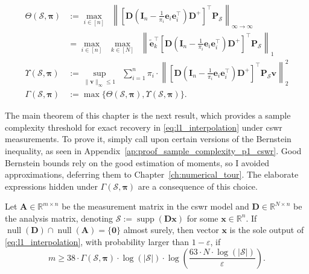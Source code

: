 \begin{definition}
    \begin{align}
        \Theta (\mathcal{S}, \bm{\pi}) & := \underset{i \in [n]}{\max} \enspace \left \| \left [ \mathbf{D} \left ( \mathbf{I}_n - \frac{1}{\pi_{i}}\mathbf{e}_{i} \mathbf{e}_{i}^\top \right ) \mathbf{D}^{+} \right ]^\top \mathbf{P}_{\mathcal{S}}\right \|_{\infty \to \infty} \\
        & = \underset{i \in [n]}{\max} \enspace \underset{k \in [N]}{\max} \enspace \left \| \tilde{\mathbf{e}}_k^{\top} \left [ \mathbf{D} \left ( \mathbf{I}_n - \frac{1}{\pi_{i}}\mathbf{e}_{i} \mathbf{e}_{i}^\top \right ) \mathbf{D}^{+} \right ]^\top \mathbf{P}_{\mathcal{S}}\right \|_{1} \\
        \Upsilon (\mathcal{S}, \bm{\pi}) & := \underset{\|\mathbf{v}\|_\infty \leq 1}{\sup} \enspace \sum_{i=1}^{n} \pi_i \cdot \left \| \left [ \mathbf{D} \left ( \mathbf{I}_n - \frac{1}{\pi_{i}}\mathbf{e}_{i} \mathbf{e}_{i}^\top \right ) \mathbf{D}^{+} \right ]^\top \mathbf{P}_{\mathcal{S}} \mathbf{v} \right \|_{2}^2\\
        \Gamma (\mathcal{S}, \bm{\pi}) & := \max \{ \Theta (\mathcal{S}, \bm{\pi}), \Upsilon (\mathcal{S}, \bm{\pi})\}.
    \end{align}
    \label{def:sample_complexity_parameters}
\end{definition}

The main theorem of this chapter is the next result, which provides a sample complexity threshold for exact recovery in \eqref{eq:l1_interpolation} under \acrshort{cswr} measurements. To prove it, simply call upon certain versions of the Bernstein inequality, as seen in Appendix~\ref{ap:proof_sample_complexity_p1_cswr}. Good Bernstein bounds rely on the good estimation of moments, so I avoided approximations, deferring them to Chapter~\ref{ch:numerical_tour}. The elaborate expressions hidden under $\Gamma (\mathcal{S}, \bm{\pi})$ are a consequence of this choice.

\begin{theorem}\label{thm:sample_complexity_p1_cswr}
    Let $\mathbf{A} \in \mathbb{R}^{m \times n}$ be the measurement matrix in the \acrshort{cswr} model and $\mathbf{D} \in \mathbb{R}^{N \times n}$ be the analysis matrix, denoting $\mathcal{S} := \operatorname{supp}\left ( \mathbf{Dx} \right )$ for some $\mathbf{x} \in \mathbb{R}^{n}$. If $\operatorname{null} \left ( \mathbf{D} \right ) \cap \operatorname{null} \left ( \mathbf{A} \right ) = \{ \mathbf{0} \}$ almost surely, then vector $\mathbf{x}$ is the sole output of \eqref{eq:l1_interpolation}, with probability larger than $1 - \varepsilon$, if
    \begin{equation}
        m \geq 38 \cdot \Gamma(\mathcal{S}, \bm{\pi}) \cdot \log(|\mathcal{S}|) \cdot \log \left ( \frac{63 \cdot N \cdot\log (|\mathcal{S}|)}{\varepsilon} \right ).
    \end{equation}
\end{theorem}

